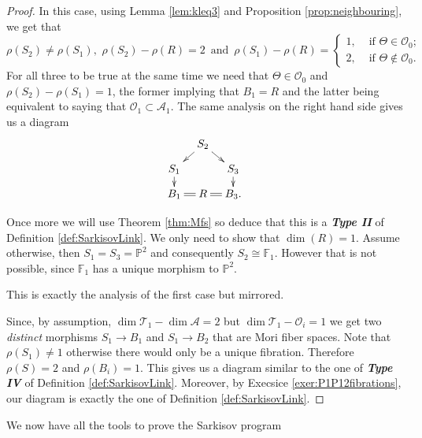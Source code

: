 \documentclass[a4paper,11pt]{amsart}
\def\dim{\operatorname{dim}}
\newcommand{\OO}{\mathcal{O}}
\newcommand{\Aa}{\mathcal{A}}
\newcommand{\Tt}{\mathcal{T}}
\newcommand{\PP}{\mathbb{P}}
\renewcommand{\FF}{\mathbb{F}}
\newcommand{\isom}{\cong}
\begin{document}
\begin{proof}
	\noindent In this case, using Lemma \ref{lem:kleq3} and Proposition \ref{prop:neighbouring}, we get that
	\[
	\rho(S_2) \neq \rho(S_1), \, \, 
	\rho(S_2) - \rho(R) = 2 \, \text{ and } \, \rho(S_1) - \rho(R) =
	\left\{
	\begin{array}{ll}
		1, & \text{ if } \Theta \in \OO_0;\\
		2, & \text{ if } \Theta \not\in \OO_0.
	\end{array}
	\right.
	\]
	For all three to be true at the same time we need that $\Theta \in \OO_0$ and $\rho(S_2) - \rho(S_1) = 1$, the former implying that $B_1 = R$ and the latter being equivalent to saying that $\OO_1 \subset \Aa_1$.
	The same analysis on the right hand side gives us a diagram
	\[
	\xymatrix@R=.3cm@C=.3cm{
	&S_2 \ar[ld] \ar[rd]\\
	S_1 \ar[d] && S_3 \ar[d]\\
	B_1 \ar@{=}[r]& R \ar@{=}[r]& B_3.
	}
	\]
	
	Once more we will use Theorem \ref{thm:Mfs} so deduce that this is a \emph{\textbf{Type II}} of Definition \ref{def:SarkisovLink}.
	We only need to show that $\dim(R) = 1$.
	Assume otherwise, then $S_1 = S_3 = \PP^2$ and consequently $S_2 \isom \FF_1$.
	However that is not possible, since $\FF_1$ has a unique morphism to $\PP^2$.
	
	\noindent\fbox{Case: $k=2$ and $\OO_1 \subset \Aa_2$}
	
	\noindent This is exactly the analysis of the first case but mirrored.
	
	\noindent{}
	
	\noindent 
	Since, by assumption, $\dim \Tt_1 -\dim \Aa = 2$ but $\dim \Tt_1 - \OO_i = 1$ we get two \emph{distinct} morphisms $S_1 \to B_1$ and $S_1 \to B_2$ that are Mori fiber spaces.
	Note that $\rho(S_1) \neq 1$ otherwise there would only be a unique fibration.
	Therefore $\rho(S) = 2$ and $\rho(B_i) = 1$. 
	This gives us a diagram similar to the one of \emph{\textbf{Type IV}} of Definition \ref{def:SarkisovLink}.
	Moreover, by Execsice \ref{exer:P1P12fibrations}, our diagram is exactly the one of Definition \ref{def:SarkisovLink}.
\end{proof}

We now have all the tools to prove the Sarkisov program
\end{document}
